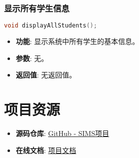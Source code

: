 \subsubsection{显示所有学生信息}
\begin{lstlisting}[language=C, caption=显示所有学生信息函数]
void displayAllStudents();
\end{lstlisting}
\begin{itemize}
    \item \textbf{\textcolor{mydeepgreen}{功能}}: 显示系统中所有学生的基本信息。
    \item \textbf{\textcolor{mydeepgreen}{参数}}: 无。
    \item \textbf{\textcolor{mydeepgreen}{返回值}}: 无返回值。
\end{itemize}

\section{项目资源}
\begin{itemize}
    \item \textbf{源码仓库}: \href{https://github.com/Musubit/learn_pbl_with_c/tree/main/projects/SIMS}{GitHub - SIMS项目}
    \item \textbf{在线文档}: \href{https://github.com/Musubit/learn_pbl_with_c/blob/main/projects/SIMS/README.md}{项目文档}
\end{itemize}
